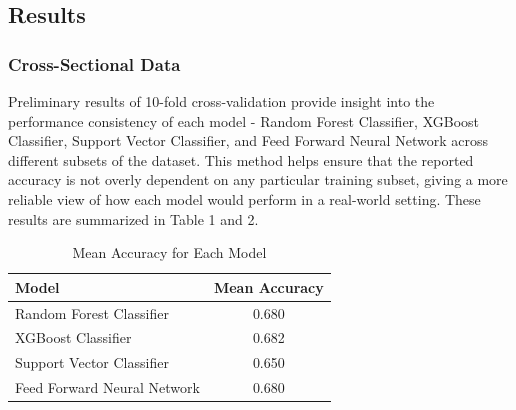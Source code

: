 \documentclass[12pt]{extarticle}
\begin{document}
  \subsection{Results} 
  \subsubsection{Cross-Sectional Data}

    Preliminary results of 10-fold cross-validation provide insight into the performance consistency of each model - Random Forest Classifier, XGBoost Classifier, Support Vector Classifier, and Feed Forward Neural Network across different subsets of the dataset. 
    This method helps ensure that the reported accuracy is not overly dependent on any particular training subset, giving a more reliable view of how each model would perform in a real-world setting. 
    These results are summarized in Table 1 and 2.

    \begin{table}[h!]
        \centering
        \caption{10-Fold Cross-Validation Results for Each Model}
        \label{table:10foldcv-results}
    \end{table}

    \begin{table}[h!]
        \centering
        \begin{tabular}{|l|c|}
            \hline
            \textbf{Model} & \textbf{Mean Accuracy} \\
            \hline
            Random Forest Classifier & 0.680 \\
            \hline
            XGBoost Classifier & 0.682 \\
            \hline
            Support Vector Classifier & 0.650 \\
            \hline
            Feed Forward Neural Network & 0.680 \\
            \hline
        \end{tabular}
        \caption{Mean Accuracy for Each Model}
        \label{'table:mean_accuracy_table'}
    \end{table}
\end{document}
